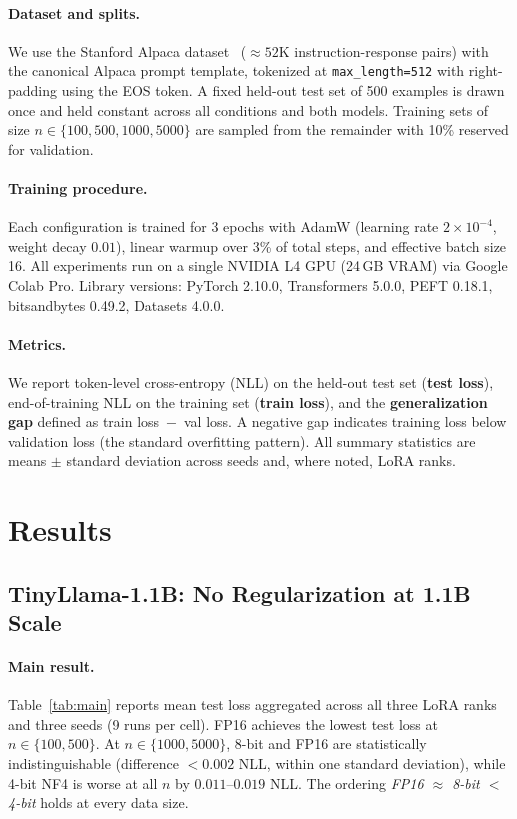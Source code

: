 \documentclass{article}
\begin{document}
\paragraph{Dataset and splits.}
We use the Stanford Alpaca dataset~\citep{taori2023alpaca} (${\approx}52$K
instruction-response pairs) with the canonical Alpaca prompt template, tokenized
at \texttt{max\_length=512} with right-padding using the EOS token. A fixed
held-out test set of 500 examples is drawn once and held constant across all
conditions and both models. Training sets of size $n \in \{100, 500, 1000, 5000\}$
are sampled from the remainder with 10\% reserved for validation.

\paragraph{Training procedure.}
Each configuration is trained for 3 epochs with AdamW (learning rate
$2\times10^{-4}$, weight decay $0.01$), linear warmup over 3\% of total steps,
and effective batch size 16. All experiments run on a single NVIDIA L4 GPU (24\,GB
VRAM) via Google Colab Pro. Library versions: PyTorch 2.10.0, Transformers 5.0.0,
PEFT 0.18.1, bitsandbytes 0.49.2, Datasets 4.0.0.

\paragraph{Metrics.}
We report token-level cross-entropy (NLL) on the held-out test set (\textbf{test
loss}), end-of-training NLL on the training set (\textbf{train loss}), and the
\textbf{generalization gap} defined as train loss~$-$~val loss. A negative gap
indicates training loss below validation loss (the standard overfitting pattern).
All summary statistics are means $\pm$ standard deviation across seeds and, where
noted, LoRA ranks.

\section{Results}
\label{sec:results}

\subsection{TinyLlama-1.1B: No Regularization at 1.1B Scale}

\paragraph{Main result.}
Table~\ref{tab:main} reports mean test loss aggregated across all three LoRA ranks
and three seeds (9 runs per cell). FP16 achieves the lowest test loss at $n \in
\{100, 500\}$. At $n \in \{1000, 5000\}$, 8-bit and FP16 are statistically
indistinguishable (difference $< 0.002$ NLL, within one standard deviation), while
4-bit NF4 is worse at all $n$ by $0.011$--$0.019$ NLL. The ordering
\emph{FP16 $\approx$ 8-bit $<$ 4-bit} holds at every data size.
\end{document}
